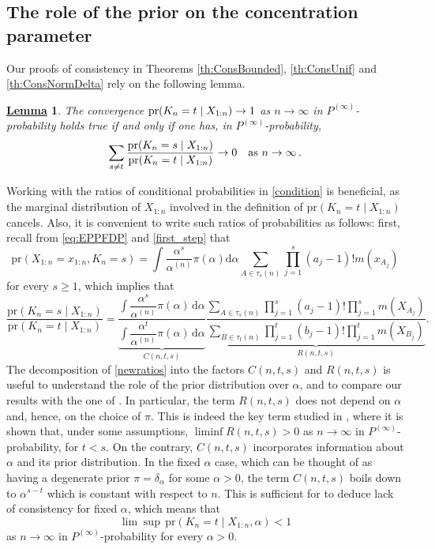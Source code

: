\documentclass[12pt]{article}
\newtheorem{Lem}{\underline{\bf Lemma}}
\begin{document}
\subsection{The role of the prior on the concentration parameter}
Our proofs of consistency in Theorems \ref{th:ConsBounded}, \ref{th:ConsUnif} and \ref{th:ConsNormDelta} rely on the following lemma.
\begin{Lem}\label{sufficient}
The convergence $\text{\rm pr}(K_n = t \mid X_{1:n}) \to 1$ as $n\to\infty$ in $P^{(\infty)}$-probability holds true if and only if one has, in $P^{(\infty)}$-probability,
\begin{equation}\label{condition}
\sum_{s \neq t} \frac{\text{\rm pr}(K_n = s \mid X_{1:n})}{\text{\rm pr}(K_n = t \mid X_{1:n})} \to 0 \quad \text{as } n\to\infty\,.
\end{equation}
\end{Lem}
Working with the ratios of conditional probabilities in \eqref{condition} is beneficial, as the marginal distribution of $X_{1:n}$ involved in the definition of $\text{pr}(K_n = t \mid X_{1:n})$ cancels. Also, it is convenient to write such ratios of probabilities as follows:
 first, recall from \eqref{eq:EPPFDP} and \eqref{first_step} that
\[
\text{pr}( X_{1:n}= x_{1:n}, K_n = s ) 
= \int \dfrac{\alpha^s}{\alpha^{(n)}} \pi(\alpha) \mathrm{d}\alpha \sum_{A \in \tau_s(n)} \prod_{j=1}^s (a_j-1)!m(x_{A_j})
\]
for every $s\geq 1$, which implies that
\begin{equation}\label{newratios}
\frac{\text{pr}(K_n = s \mid X_{1:n})}{\text{pr}(K_n = t \mid X_{1:n})}  = \underbrace{\frac{\int \dfrac{\alpha^s}{\alpha^{(n)}} \pi(\alpha) \, \mathrm{d}\alpha}{\int \dfrac{\alpha^t}{\alpha^{(n)}} \pi(\alpha) \, \mathrm{d}\alpha}}_{C(n,t, s)}\underbrace{\frac{\sum_{A \in \tau_s(n)}\prod_{j=1}^s(a_j-1)!\prod_{j=1}^s m(X_{A_j})}{\sum_{B \in \tau_t(n)}\prod_{j=1}^t(b_j-1)!\prod_{j=1}^t m(X_{B_j})}}_{R(n,t,s)}.
\end{equation}
The decomposition of \eqref{newratios} into the factors $C(n,t,s)$ and $R(n,t,s)$ is useful to understand the role of the prior distribution over $\alpha$, and to compare our results with the one of \citet{Miller2013,Miller2014}. In particular, the term $R(n,t,s)$ does not depend on $\alpha$ and, hence, on the choice of %
$\pi$. %
This is indeed the key term studied in \citet{Miller2014}, where it is shown that, under some assumptions, $\liminf R(n,t,s)>0$ as $n\to\infty$ in $P^{(\infty)}$-probability, for $t < s$. On the contrary, %
$C(n,t,s)$ incorporates information about $\alpha$ and its prior distribution. 
In the fixed $\alpha$ case, which can be thought of as having a degenerate prior $\pi=\delta_{\alpha}$ for some $\alpha>0$, the term $C(n,t,s)$ boils down to $\alpha^{s-t}$ %
which is constant with respect to $n$. This is sufficient for \citet{Miller2014} to deduce lack of consistency for fixed $\alpha$, which means that
\begin{equation}\label{eq:inconst_fixed_alpha}
\lim \sup \, \text{pr}( K_n = t \mid X_{1:n},\alpha) <1
\end{equation}
as $n \to \infty$ in $P^{(\infty)}$-probability for every $\alpha>0$.
\end{document}
